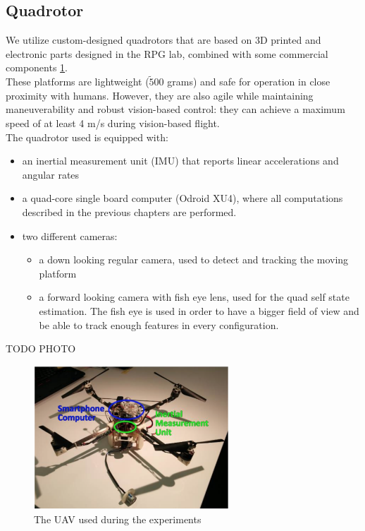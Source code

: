\subsection{Quadrotor}
We utilize custom-designed quadrotors that are based on 3D printed and electronic parts designed in the RPG lab, combined with some commercial components \ref{fig:quad_hardware}.\\
These platforms are lightweight ($\tilde500$ grams) and safe for operation in close proximity with humans. However, they are also agile while maintaining maneuverability and robust vision-based control: they can achieve a maximum speed of at least 4 m/s during vision-based flight.\\
The quadrotor used is equipped with:
\begin{itemize}
\item an inertial measurement unit (IMU) that reports linear accelerations and angular rates
\item a quad-core single board computer (Odroid XU4), where all computations described in the previous chapters are performed.
\item two different cameras:
\begin{itemize}
\item a down looking regular camera, used to detect and tracking the moving platform
\item a forward looking camera with fish eye lens, used for the quad self state estimation. The fish eye is used in order to have a bigger field of view and be able to track enough features in every configuration.
\end{itemize}
\end{itemize}
TODO PHOTO
\begin{figure}[!ht]
    \centering
    \includegraphics[width=0.65\textwidth]{img/photo_quad.png}
    \caption{The UAV used during the experiments}
    \label{fig:quad_hardware}
\end{figure}

